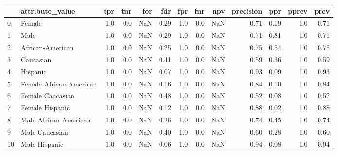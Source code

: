 \begin{tabular}{llrrrrrrrrrrr}
\toprule
{} &          attribute\_value &  tpr &  tnr &  for &   fdr &  fpr &  fnr &  npv &  precision &   ppr &  pprev &  prev \\
\midrule
0  &                   Female &  1.0 &  0.0 &  NaN &  0.29 &  1.0 &  0.0 &  NaN &       0.71 &  0.19 &    1.0 &  0.71 \\
1  &                     Male &  1.0 &  0.0 &  NaN &  0.29 &  1.0 &  0.0 &  NaN &       0.71 &  0.81 &    1.0 &  0.71 \\
2  &         African-American &  1.0 &  0.0 &  NaN &  0.25 &  1.0 &  0.0 &  NaN &       0.75 &  0.54 &    1.0 &  0.75 \\
3  &                Caucasian &  1.0 &  0.0 &  NaN &  0.41 &  1.0 &  0.0 &  NaN &       0.59 &  0.36 &    1.0 &  0.59 \\
4  &                 Hispanic &  1.0 &  0.0 &  NaN &  0.07 &  1.0 &  0.0 &  NaN &       0.93 &  0.09 &    1.0 &  0.93 \\
5  &  Female African-American &  1.0 &  0.0 &  NaN &  0.16 &  1.0 &  0.0 &  NaN &       0.84 &  0.10 &    1.0 &  0.84 \\
6  &         Female Caucasian &  1.0 &  0.0 &  NaN &  0.48 &  1.0 &  0.0 &  NaN &       0.52 &  0.08 &    1.0 &  0.52 \\
7  &          Female Hispanic &  1.0 &  0.0 &  NaN &  0.12 &  1.0 &  0.0 &  NaN &       0.88 &  0.02 &    1.0 &  0.88 \\
8  &    Male African-American &  1.0 &  0.0 &  NaN &  0.26 &  1.0 &  0.0 &  NaN &       0.74 &  0.45 &    1.0 &  0.74 \\
9  &           Male Caucasian &  1.0 &  0.0 &  NaN &  0.40 &  1.0 &  0.0 &  NaN &       0.60 &  0.28 &    1.0 &  0.60 \\
10 &            Male Hispanic &  1.0 &  0.0 &  NaN &  0.06 &  1.0 &  0.0 &  NaN &       0.94 &  0.08 &    1.0 &  0.94 \\
\bottomrule
\end{tabular}
